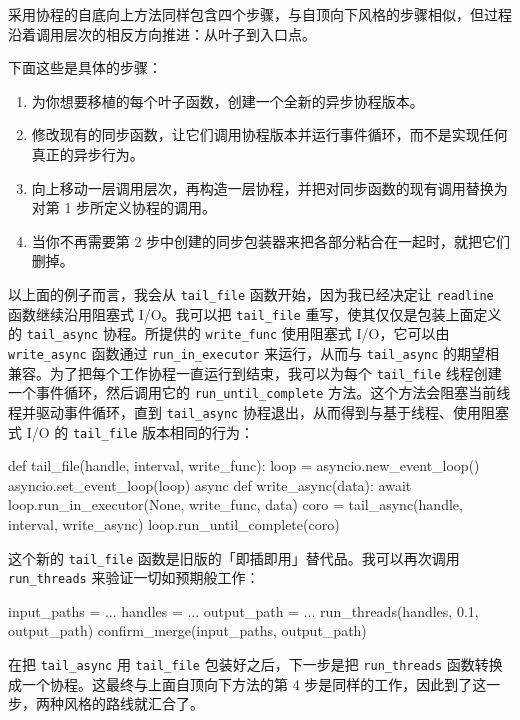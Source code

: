 采用协程的自底向上方法同样包含四个步骤，与自顶向下风格的步骤相似，但过程沿着调用层次的相反方向推进：从叶子到入口点。

下面这些是具体的步骤：

\begin{enumerate}
\item 为你想要移植的每个叶子函数，创建一个全新的异步协程版本。
\item 修改现有的同步函数，让它们调用协程版本并运行事件循环，而不是实现任何真正的异步行为。
\item 向上移动一层调用层次，再构造一层协程，并把对同步函数的现有调用替换为对第 1 步所定义协程的调用。
\item 当你不再需要第 2 步中创建的同步包装器来把各部分粘合在一起时，就把它们删掉。
\end{enumerate}

以上面的例子而言，我会从 \texttt{tail\_file} 函数开始，因为我已经决定让 \texttt{readline} 函数继续沿用阻塞式 I/O。我可以把 \texttt{tail\_file} 重写，使其仅仅是包装上面定义的 \texttt{tail\_async} 协程。所提供的 \texttt{write\_func} 使用阻塞式 I/O，它可以由 \texttt{write\_async} 函数通过 \texttt{run\_in\_executor} 来运行，从而与 \texttt{tail\_async} 的期望相兼容。为了把每个工作协程一直运行到结束，我可以为每个 \texttt{tail\_file} 线程创建一个事件循环，然后调用它的 \texttt{run\_until\_complete} 方法。这个方法会阻塞当前线程并驱动事件循环，直到 \texttt{tail\_async} 协程退出，从而得到与基于线程、使用阻塞式 I/O 的 \texttt{tail\_file} 版本相同的行为：

\begin{codebox}[python]
def tail_file(handle, interval, write_func):
    loop = asyncio.new_event_loop()
    asyncio.set_event_loop(loop)
    async def write_async(data):
        await loop.run_in_executor(None, write_func, data)
    coro = tail_async(handle, interval, write_async)
    loop.run_until_complete(coro)
\end{codebox}

这个新的 \texttt{tail\_file} 函数是旧版的「即插即用」替代品。我可以再次调用 \texttt{run\_threads} 来验证一切如预期般工作：

\begin{codebox}[python]
input_paths = ...
handles = ...
output_path = ...
run_threads(handles, 0.1, output_path)
confirm_merge(input_paths, output_path)
\end{codebox}

在把 \texttt{tail\_async} 用 \texttt{tail\_file} 包装好之后，下一步是把 \texttt{run\_threads} 函数转换成一个协程。这最终与上面自顶向下方法的第 4 步是同样的工作，因此到了这一步，两种风格的路线就汇合了。

